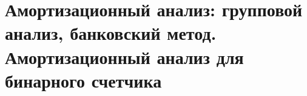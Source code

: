 \section{Амортизационный анализ: групповой анализ, банковский метод. Амортизационный анализ для бинарного счетчика }